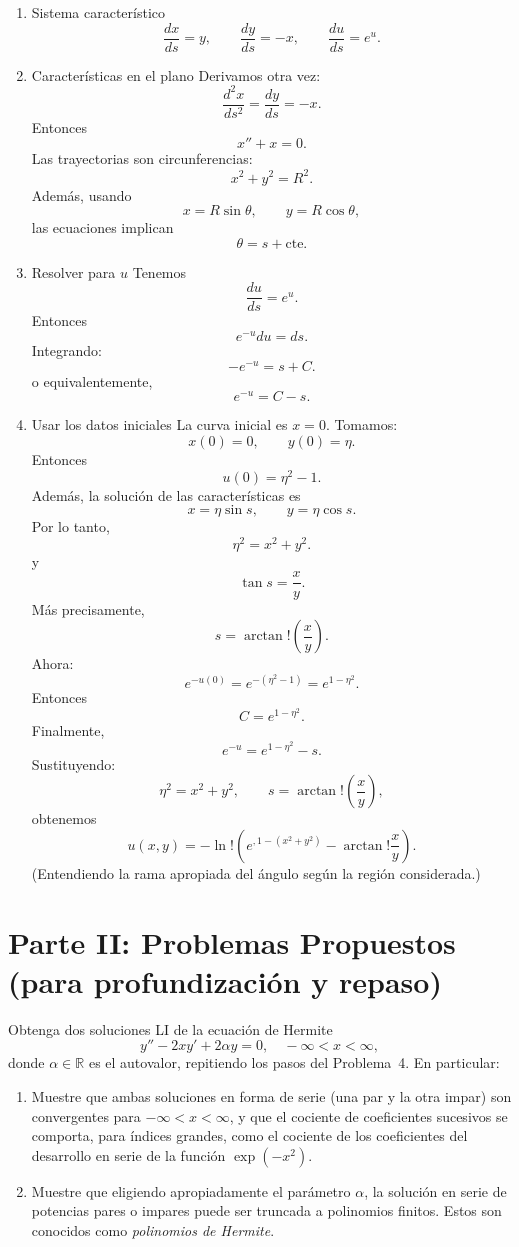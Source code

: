 \documentclass[11pt,spanish]{article}
\newcommand{\sca}[1]{\mathbb{#1}}
\newcounter{problema}
\newcommand{\prob}{\stepcounter{problema} \vspace{.5cm} \noindent{\bf Problema \arabic{problema}: }}
\begin{document}
\begin{enumerate}
\item Sistema característico
$$
\frac{dx}{ds}=y,
\qquad
\frac{dy}{ds}=-x,
\qquad
\frac{du}{ds}=e^u.
$$

\item Características en el plano
Derivamos otra vez:
$$
\frac{d^2x}{ds^2}
=
\frac{dy}{ds}
=
-x.
$$
Entonces
$$
x''+x=0.
$$
Las trayectorias son circunferencias:
$$
x^2+y^2=R^2.
$$
Además, usando
$$
x=R\sin\theta,
\qquad
y=R\cos\theta,
$$
las ecuaciones implican
$$
\theta=s+\text{cte}.
$$

\item Resolver para $u$
Tenemos
$$
\frac{du}{ds}=e^u.
$$
Entonces
$$
e^{-u}du=ds.
$$
Integrando:
$$
-e^{-u}=s+C.
$$
o equivalentemente,
$$
e^{-u}=C-s.
$$

\item Usar los datos iniciales
La curva inicial es $x=0$. Tomamos:
$$
x(0)=0,
\qquad
y(0)=\eta.
$$
Entonces
$$
u(0)=\eta^2-1.
$$
Además, la solución de las características es
$$
x=\eta\sin s,
\qquad
y=\eta\cos s.
$$
Por lo tanto,
$$
\eta^2=x^2+y^2.
$$
y
$$
\tan s=\frac{x}{y}.
$$
Más precisamente,
$$
s=\arctan!\left(\frac{x}{y}\right).
$$
Ahora:
$$
e^{-u(0)}
=
e^{-(\eta^2-1)}
=
e^{1-\eta^2}.
$$
Entonces
$$
C=e^{1-\eta^2}.
$$
Finalmente,
$$
e^{-u}
=
e^{1-\eta^2}-s.
$$
Sustituyendo:
$$
\eta^2=x^2+y^2,
\qquad
s=\arctan!\left(\frac{x}{y}\right),
$$
obtenemos
$$
\boxed{
u(x,y)
=
-\ln!\left(
e^{,1-(x^2+y^2)}
-
\arctan!\frac{x}{y}
\right)
}.
$$
(Entendiendo la rama apropiada del ángulo según la región considerada.)
\end{enumerate}

\section*{Parte II: Problemas Propuestos (para profundización y repaso)}


\prob Obtenga dos soluciones LI de la ecuación de Hermite
\[
y'' - 2xy' + 2\alpha y = 0, \quad -\infty<x<\infty,
\]
donde $\alpha\in\sca{R}$ es el autovalor, repitiendo los pasos del Problema~4. En particular:
\begin{enumerate}
\item Muestre que ambas soluciones en forma de serie (una par y la otra impar) son convergentes para $-\infty<x<\infty$, y que el cociente de coeficientes sucesivos se comporta, para índices grandes, como el cociente de los coeficientes del desarrollo en serie de la función $\exp(-x^2)$.
\item Muestre que eligiendo apropiadamente el parámetro $\alpha$, la solución en serie de potencias pares o impares puede ser truncada a polinomios finitos. Estos son conocidos como \emph{polinomios de Hermite}.
\end{enumerate}
\end{document}
